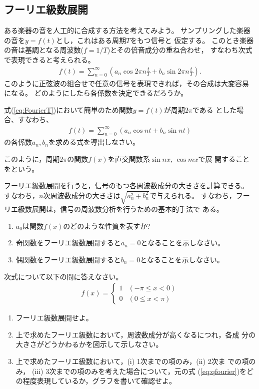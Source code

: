 \documentclass[twocolumn,11pt]{jarticle}
\begin{document}
\subsection{フーリエ級数展開}

ある楽器の音を人工的に合成する方法を考えてみよう。
サンプリングした楽器の音を$y=f(t)$とし，これはある周期$T$をもつ信号と
仮定する。
このとき楽器の音は基調となる周波数($f=1/T$)とその倍音成分の重ね合わせ，
すなわち次式で表現できると考えられる。
\begin{align}
  \label{eq:FourierT}
  f(t)=\sum_{n=0}^{\infty} 
  (a_n\cos 2\pi n\frac{t}{T} + b_n \sin 2\pi n\frac{t}{T}).
\end{align}
このように正弦波の組合せで任意の信号を表現できれば，その合成は大変容易
になる。
どのようにしたら各係数を決定できるだろうか。

\nquestion
式(\ref{eq:FourierT})において簡単のため関数$y=f(t)$が周期$2\pi$である
とした場合、すなわち、
\begin{align}
  f(t)=\sum_{n=0}^{\infty} (a_n\cos nt + b_n \sin nt)
  \label{eq:Fourier2pi}
\end{align}
の各係数$a_n,b_n$を求める式を導出しなさい。

\comment
このように，周期$2\pi$の関数$f(x)$を直交関数系$\sin nx$, $\cos mx$で展
開することをという。

フーリエ級数展開を行うと，信号のもつ各周波数成分の大きさを計算できる。
すなわち，$n$次周波数成分の大きさは$\sqrt{a_n^2+b_n^2}$で与えられる。
すなわち，フーリエ級数展開は，信号の周波数分析を行うための基本的手法で
ある。


\nquestion
\begin{enumerate}
\item $a_0$は関数$f(x)$のどのような性質を表すか?
\item 奇関数をフーリエ級数展開すると$a_n=0$となることを示しなさい。
\item 偶関数をフーリエ級数展開すると$b_n=0$となることを示しなさい。
  \end{enumerate}

\exercise
次式について以下の問に答えなさい。
  \begin{align}
    \label{eq:qfourier}
    f(x)=
    \begin{cases}
      1 & (-\pi\le x<0)\\
      0 & (0\le x<\pi)
    \end{cases}
  \end{align}
\begin{enumerate}
\item フーリエ級数展開せよ。
\item 上で求めたフーリエ級数において，周波数成分が高くなるにつれ，各成
  分の大きさがどうかわるかを図示して示しなさい。
\item 上で求めたフーリエ級数において，(i) 1次までの項のみ，(ii) 2次ま
  での項のみ，
  (iii) 3次までの項のみを考えた場合について，元の式
  (\ref{eq:qfourier})をどの程度表現しているか，グラフを書いて確認せよ。
\end{enumerate}
\end{document}
